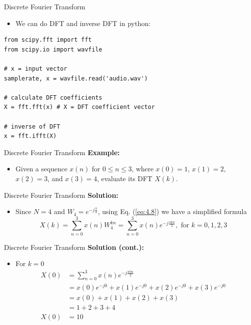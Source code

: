 \documentclass[pdflatex,compress,mathserif]{beamer}
\begin{document}
\begin{frame}[fragile]{Discrete Fourier Transform}
    \begin{itemize}
        \item We can do DFT and inverse DFT in python:
    \end{itemize}
    \begin{verbatim}
from scipy.fft import fft
from scipy.io import wavfile

# x = input vector
samplerate, x = wavfile.read('audio.wav')

# calculate DFT coefficients
X = fft.fft(x) # X = DFT coefficient vector

# inverse of DFT
x = fft.ifft(X)
    \end{verbatim}
\end{frame}

\begin{frame}[fragile]{Discrete Fourier Transform}
    \textbf{Example:}
    \begin{itemize}
        \item Given a sequence $x(n)$ for $0 \leq n \leq 3$, where $x(0) = 1$, $x(1) = 2$, $x(2) = 3$, and $x(3) = 4$, evaluate its DFT $X(k)$.
    \end{itemize}
\end{frame}

\begin{frame}[fragile]{Discrete Fourier Transform}
    \textbf{Solution:}
    \begin{itemize}
        \item Since $N = 4$ and $W_4 = e^{-j\frac{\pi}{2}}$, using Eq. (\ref{eq:4.8}) we have a simplified formula
        \begin{equation*}
            X(k) = \sum_{n=0}^{3} x(n) W_{4}^{kn} = \sum_{n=0}^{3} x(n)e^{-j\frac{\pi kn}{2}},\text{ for } k = 0,1,2,3
        \end{equation*}
    \end{itemize}
\end{frame}

\begin{frame}[fragile]{Discrete Fourier Transform}
    \textbf{Solution (cont.):}
    \begin{itemize}
        \item For $k = 0$
        \begin{align*}
            X(0) &= \sum_{n=0}^{3} x(n)e^{-j\frac{\pi 0n}{2}} \\
            &= x(0)e^{-j0} + x(1)e^{-j0} + x(2)e^{-j0} + x(3)e^{-j0} \\
            &= x(0) + x(1) + x(2) + x(3) \\
            &= 1 + 2 + 3 + 4 \\
            X(0) &= 10
        \end{align*}
    \end{itemize}
\end{frame}
\end{document}

